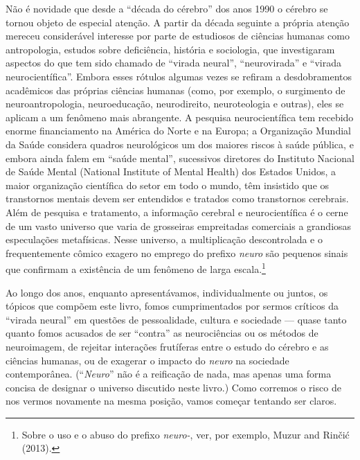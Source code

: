 Não é novidade que desde a ``década do cérebro'' dos anos 1990 o cérebro
se tornou objeto de especial atenção. A partir da década seguinte a
própria atenção mereceu considerável interesse por parte de estudiosos
de ciências humanas como antropologia, estudos sobre deficiência,
história e sociologia, que investigaram aspectos do que tem sido chamado
de ``virada neural'', ``neurovirada'' e ``virada neurocientífica''.
Embora esses rótulos algumas vezes se refiram a desdobramentos
acadêmicos das próprias ciências humanas (como, por exemplo, o
surgimento de neuroantropologia, neuroeducação, neurodireito,
neuroteologia e outras), eles se aplicam a um fenômeno mais abrangente.
A pesquisa neurocientífica tem recebido enorme financiamento na América
do Norte e na Europa; a Organização Mundial da Saúde considera quadros
neurológicos um dos maiores riscos à saúde pública, e embora ainda falem
em ``saúde mental'', sucessivos diretores do Instituto Nacional de Saúde
Mental (National Institute of Mental Health) dos Estados Unidos, a maior
organização científica do setor em todo o mundo, têm insistido que os
transtornos mentais devem ser entendidos e tratados como transtornos
cerebrais. Além de pesquisa e tratamento, a informação cerebral e
neurocientífica é o cerne de um vasto universo que varia de grosseiras
empreitadas comerciais a grandiosas especulações metafísicas. Nesse
universo, a multiplicação descontrolada e o frequentemente cômico
exagero no emprego do prefixo \emph{neuro} são pequenos sinais que
confirmam a existência de um fenômeno de larga
escala.\footnote[1]{Sobre o uso e o abuso do prefixo \emph{neuro-}, ver, por exemplo,
Muzur and Rinčić (2013).}

Ao longo dos anos, enquanto apresentávamos, individualmente ou juntos,
os tópicos que compõem este livro, fomos cumprimentados por sermos
críticos da ``virada neural'' em questões de pessoalidade, cultura e
sociedade --- quase tanto quanto fomos acusados de ser ``contra'' as
neurociências ou os métodos de neuroimagem, de rejeitar interações
frutíferas entre o estudo do cérebro e as ciências humanas, ou de exagerar o
impacto do \emph{neuro} na sociedade contemporânea. (``\emph{Neuro}''
não é a reificação de nada, mas apenas uma forma concisa de designar o
universo discutido neste livro.) Como corremos o risco de nos vermos
novamente na mesma posição, vamos começar tentando ser claros.


